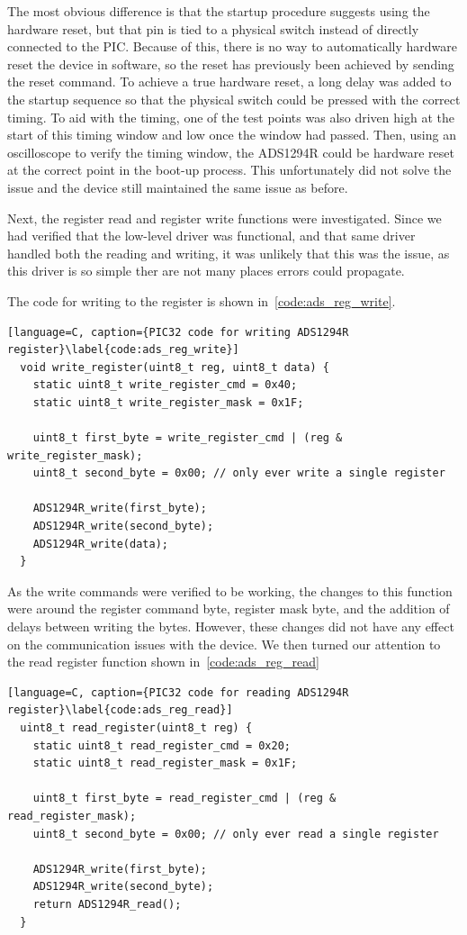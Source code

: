 The most obvious difference is that the startup procedure suggests using the hardware reset,
but that pin is tied to a physical switch instead of directly connected to the PIC.
Because of this, there is no way to automatically hardware reset the device in software,
so the reset has previously been achieved by sending the reset command.
To achieve a true hardware reset, a long delay was added to the startup sequence so that the physical switch could be pressed with the correct timing.
To aid with the timing, one of the test points was also driven high at the start of this timing window and low once the window had passed.
Then, using an oscilloscope to verify the timing window, the ADS1294R could be hardware reset at the correct point in the boot-up process.
This unfortunately did not solve the issue and the device still maintained the same issue as before.

Next, the register read and register write functions were investigated.
Since we had verified that the low-level driver was functional, and that same driver handled both the reading and writing,
it was unlikely that this was the issue, as this driver is so simple ther are not many places errors could propagate.

The code for writing to the register is shown in~\autoref{code:ads_reg_write}.

\begin{lstlisting}[language=C, caption={PIC32 code for writing ADS1294R register}\label{code:ads_reg_write}]
  void write_register(uint8_t reg, uint8_t data) {
    static uint8_t write_register_cmd = 0x40;
    static uint8_t write_register_mask = 0x1F;

    uint8_t first_byte = write_register_cmd | (reg & write_register_mask);
    uint8_t second_byte = 0x00; // only ever write a single register

    ADS1294R_write(first_byte);
    ADS1294R_write(second_byte);
    ADS1294R_write(data);
  }
\end{lstlisting}

As the write commands were verified to be working, the changes to this function were around the register command byte,
register mask byte, and the addition of delays between writing the bytes.
However, these changes did not have any effect on the communication issues with the device.
We then turned our attention to the read register function shown in~\autoref{code:ads_reg_read}

\begin{lstlisting}[language=C, caption={PIC32 code for reading ADS1294R register}\label{code:ads_reg_read}]
  uint8_t read_register(uint8_t reg) {
    static uint8_t read_register_cmd = 0x20;
    static uint8_t read_register_mask = 0x1F;

    uint8_t first_byte = read_register_cmd | (reg & read_register_mask);
    uint8_t second_byte = 0x00; // only ever read a single register

    ADS1294R_write(first_byte);
    ADS1294R_write(second_byte);
    return ADS1294R_read();
  }
\end{lstlisting}

